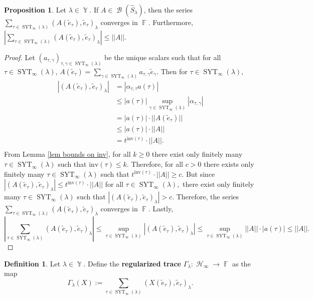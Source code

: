 \documentclass[12pt,reqno]{amsart}
\theoremstyle{definition}
\newtheorem{prop}[thm]{Proposition}
\newtheorem{defn}[thm]{Definition}
\DeclareMathOperator{\bF}{\mathbb{F}}
\DeclareMathOperator{\cH}{\mathcal{H}}
\DeclareMathOperator{\cB}{\mathcal{B}}
\DeclareMathOperator{\SYT}{\mathrm{SYT}}
\DeclareMathOperator{\Par}{\mathbb{Y}}
\begin{document}
\begin{prop}\label{prop traces converge}
   Let $\lambda \in \Par.$ If $A\in \cB(\hat{S}_{\lambda})$, then the series $\sum_{\tau \in \SYT_{\infty}(\lambda)} (A(\tilde{e}_{\tau}),\tilde{e}_{\tau})_{\lambda}$ converges in $\bF.$ Furthermore, $|\sum_{\tau \in \SYT_{\infty}(\lambda)} (A(\tilde{e}_{\tau}),\tilde{e}_{\tau})_{\lambda} | \leq ||A||.$ 
\end{prop}
\begin{proof}
    Let $(a_{\tau,\gamma})_{\tau, \gamma \in \SYT_{\infty}(\lambda)}$ be the unique scalars such that for all $\tau \in \SYT_{\infty}(\lambda)$, $A(\tilde{e}_{\tau}) = \sum_{\gamma\in \SYT_{\infty}(\lambda)} a_{\tau,\gamma} \tilde{e}_{\gamma}.$ Then for $\tau \in \SYT_{\infty}(\lambda),$ 
    \begin{align*}
        |( A(\tilde{e}_{\tau}),\tilde{e}_{\tau})_{\lambda}| &= |\alpha_{\tau,\tau} a(\tau)|\\
        &\leq |a(\tau)|\sup_{\gamma\in \SYT_{\infty}(\lambda)} |\alpha_{\tau,\gamma}| \\
        &= |a(\tau)| \cdot ||A(\tilde{e}_{\tau})||\\
        &\leq |a(\tau)| \cdot ||A||\\
        &= t^{\mathrm{inv}(\tau)}\cdot ||A||.\\
    \end{align*}
    From Lemma \ref{lem bounds on inv}, for all $k \geq 0$ there exist only finitely many $\tau \in \SYT_{\infty}(\lambda)$ such that $\mathrm{inv}(\tau) \leq k$. Therefore, for all $c > 0$ there exists only finitely many $\tau \in \SYT_{\infty}(\lambda)$ such that $t^{\mathrm{inv}(\tau)}\cdot ||A|| \geq c.$ But since $|( A(\tilde{e}_{\tau}),\tilde{e}_{\tau})_{\lambda}| \leq t^{\mathrm{inv}(\tau)}\cdot ||A||$ for all $\tau \in \SYT_{\infty}(\lambda),$ there exist only finitely many $\tau \in \SYT_{\infty}(\lambda)$ such that $|( A(\tilde{e}_{\tau}),\tilde{e}_{\tau})_{\lambda}| > c.$ Therefore, the series $\sum_{\tau \in \SYT_{\infty}(\lambda)} (A(\tilde{e}_{\tau}),\tilde{e}_{\tau})_{\lambda}$ converges in $\bF.$ Lastly, 
    $$|\sum_{\tau \in \SYT_{\infty}(\lambda)} (A(\tilde{e}_{\tau}),\tilde{e}_{\tau})_{\lambda}| \leq \sup_{\tau \in \SYT_{\infty}(\lambda)} |(A(\tilde{e}_{\tau}),\tilde{e}_{\tau})_{\lambda}| \leq \sup_{\tau \in \SYT_{\infty}(\lambda)} ||A|| \cdot |a(\tau)| \leq ||A||.$$
\end{proof}

\begin{defn}\label{defn regularized trace}
    Let $\lambda \in \Par.$ Define the \textbf{regularized trace} $\Gamma_{\lambda}:\cH_{\infty} \rightarrow \bF$ as the map 
    $$\Gamma_{\lambda}(X):= \sum_{\tau \in \SYT_{\infty}(\lambda)} (X(\tilde{e}_{\tau}),\tilde{e}_{\tau})_{\lambda}.$$
\end{defn}
\end{document}
